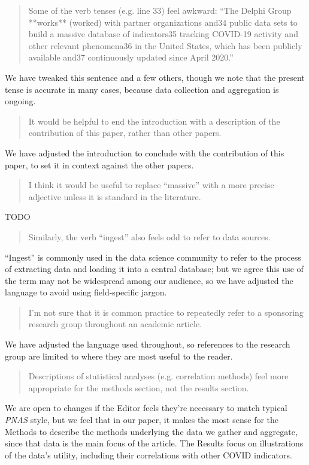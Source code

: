 \documentclass[11pt]{article}
\begin{document}
\begin{quote}
  Some of the verb tenses (e.g. line 33) feel awkward: ``The Delphi Group
  **works** (worked) with partner organizations and34 public data sets to build
  a massive database of indicators35 tracking COVID-19 activity and other
  relevant phenomena36 in the United States, which has been publicly available
  and37 continuously updated since April 2020.''
\end{quote}
We have tweaked this sentence and a few others, though we note that the present
tense is accurate in many cases, because data collection and aggregation is
ongoing.

\begin{quote}
  It would be helpful to end the introduction with a description of the
  contribution of this paper, rather than other papers.
\end{quote}
We have adjusted the introduction to conclude with the contribution of this
paper, to set it in context against the other papers.

\begin{quote}
  I think it would be useful to replace ``massive'' with a more precise
  adjective unless it is standard in the literature.
\end{quote}

TODO

\begin{quote}
  Similarly, the verb ``ingest'' also feels odd to refer to data sources.
\end{quote}
``Ingest'' is commonly used in the data science community to refer to the
process of extracting data and loading it into a central database; but we agree
this use of the term may not be widespread among our audience, so we have
adjusted the language to avoid using field-specific jargon.

\begin{quote}
  I'm not sure that it is common practice to repeatedly refer to a sponsoring
  research group throughout an academic article.
\end{quote}
We have adjusted the language used throughout, so references to the research
group are limited to where they are most useful to the reader.

\begin{quote}
  Descriptions of statistical analyses (e.g. correlation methods) feel more
  appropriate for the methods section, not the results section.
\end{quote}
We are open to changes if the Editor feels they're necessary to match typical
\textit{PNAS} style, but we feel that in our paper, it makes the most sense for
the Methods to describe the methods underlying the data we gather and aggregate,
since that data is the main focus of the article. The Results focus on
illustrations of the data's utility, including their correlations with other
COVID indicators.
\end{document}

